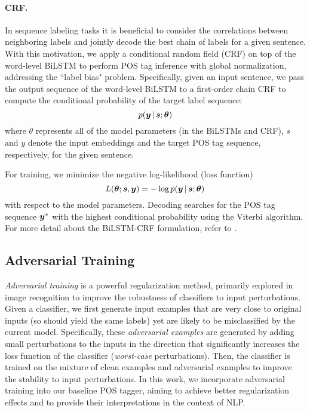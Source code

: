 \documentclass[11pt,a4paper]{article}
\newcommand{\veci}[1]{\mbox{\boldmath $#1$}}
\begin{document}
\paragraph{CRF.}
In sequence labeling tasks it is beneficial to consider the correlations between neighboring labels and jointly decode the best chain of labels for a given sentence.
With this motivation, we apply a conditional random field (CRF) \cite{lafferty:2001} on top of the word-level BiLSTM to perform POS tag inference with global normalization, addressing the ``label bias" problem.
Specifically, given an input sentence, we pass the output sequence of the word-level BiLSTM to a first-order chain CRF to compute the conditional probability of the target label sequence: 
$$p(\veci{y} \,|\, \veci{s}; \veci{\theta})$$
where \veci{\theta} represents all of the model parameters (in the BiLSTMs and CRF), \veci{s} and \veci{y} denote the input embeddings and the target POS tag sequence, respectively, for the given sentence. 

For training, we minimize the negative log-likelihood (loss function)
\begin{equation}
\label{eq:baseline_loss}
 L(\veci{\theta}; \veci{s}, \veci{y}) = - \log p(\veci{y} \,|\, \veci{s}; \veci{\theta})
\end{equation}
with respect to the model parameters.
Decoding searches for the POS tag sequence $\veci{y}^*$ with the highest conditional probability using the Viterbi algorithm.
For more detail about the BiLSTM-CRF formulation, refer to .


\subsection{Adversarial Training}
\label{sec:method:adv_training}
{\it Adversarial training} \cite{Goodfellow2015explain} is a powerful regularization method, primarily explored in
image recognition to improve the robustness of classifiers to input perturbations. 
Given a classifier, we first generate input examples that are very close to original inputs (so should yield the same labels) yet are likely to be misclassified by the current model.
Specifically, these {\it adversarial examples} are generated by adding small perturbations to the inputs in the direction that significantly increases the loss function
of the classifier ({\it worst-case} perturbations).
Then, the classifier is trained on the mixture of clean examples and adversarial examples to improve the stability to input perturbations.
In this work, we
incorporate adversarial training into our baseline POS tagger, aiming to achieve better regularization effects and to provide their interpretations in the context of NLP.
\end{document}
